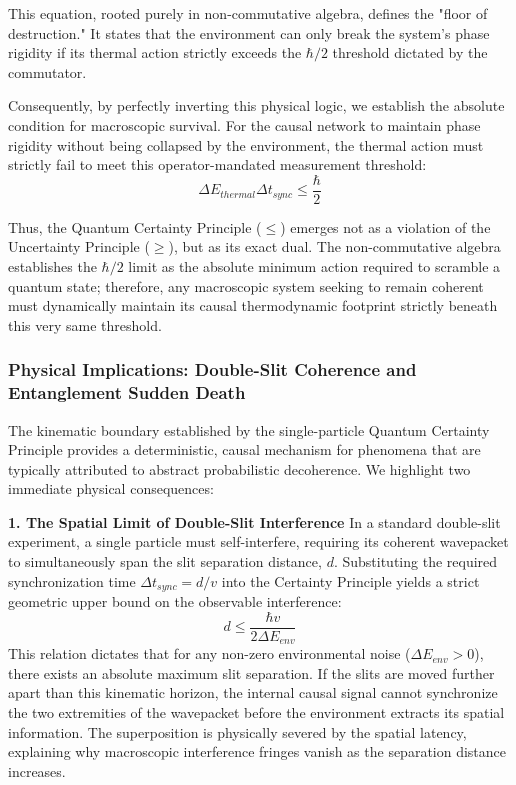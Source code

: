 \documentclass[11pt,a4paper]{article}
\begin{document}
This equation, rooted purely in non-commutative algebra, defines the "floor of destruction." It states that the environment can only break the system's phase rigidity if its thermal action strictly exceeds the $\hbar/2$ threshold dictated by the commutator.

Consequently, by perfectly inverting this physical logic, we establish the absolute condition for macroscopic survival. For the causal network to maintain phase rigidity without being collapsed by the environment, the thermal action must strictly fail to meet this operator-mandated measurement threshold:
\begin{equation}
\label{eq:certainty_operator}
    \Delta E_{thermal} \Delta t_{sync} \le \frac{\hbar}{2}
\end{equation}

Thus, the Quantum Certainty Principle ($\le$) emerges not as a violation of the Uncertainty Principle ($\ge$), but as its exact dual. The non-commutative algebra establishes the $\hbar/2$ limit as the absolute minimum action required to scramble a quantum state; therefore, any macroscopic system seeking to remain coherent must dynamically maintain its causal thermodynamic footprint strictly beneath this very same threshold.

\subsubsection*{Physical Implications: Double-Slit Coherence and Entanglement Sudden Death}

The kinematic boundary established by the single-particle Quantum Certainty Principle provides a deterministic, causal mechanism for phenomena that are typically attributed to abstract probabilistic decoherence. We highlight two immediate physical consequences:

\textbf{1. The Spatial Limit of Double-Slit Interference}
In a standard double-slit experiment, a single particle must self-interfere, requiring its coherent wavepacket to simultaneously span the slit separation distance, $d$. Substituting the required synchronization time $\Delta t_{sync} = d/v$ into the Certainty Principle yields a strict geometric upper bound on the observable interference:
\begin{equation}
    d \le \frac{\hbar v}{2 \Delta E_{env}}
\end{equation}
This relation dictates that for any non-zero environmental noise ($\Delta E_{env} > 0$), there exists an absolute maximum slit separation. If the slits are moved further apart than this kinematic horizon, the internal causal signal cannot synchronize the two extremities of the wavepacket before the environment extracts its spatial information. The superposition is physically severed by the spatial latency, explaining why macroscopic interference fringes vanish as the separation distance increases.
\end{document}
